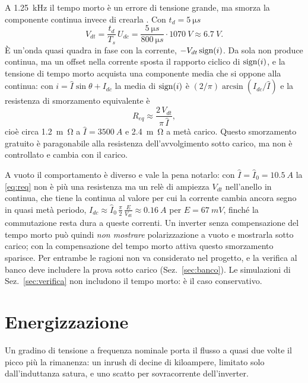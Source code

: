 \documentclass[10pt,a4paper]{scrartcl}
\newcommand{\Ts}{T_s}
\newcommand{\Idc}{I_{dc}}
\newcommand{\Izeropk}{\hat I_0}
\newcommand{\Udc}{U_{dc}}
\begin{document}
\begin{onehalfspace}
A \SI{1.25}{kHz} il tempo morto è un errore di tensione grande, ma smorza la componente continua invece di crearla \cite{jeong1991, holmes2003, pwrdeadtime}. Con $t_d = \SI{5}{\micro s}$
\begin{equation}
V_{dt} = \frac{t_d}{\Ts}\,\Udc = \frac{\SI{5}{\micro s}}{\SI{800}{\micro s}}\cdot\SI{1070}{V} \approx \SI{6.7}{V}.
\label{eq:vdt}
\end{equation}
È un'onda quasi quadra in fase con la corrente, $-V_{dt}\,\text{sign}(i)$. Da sola non produce continua, ma un offset nella corrente sposta il rapporto ciclico di $\text{sign}(i)$, e la tensione di tempo morto acquista una componente media che si oppone alla continua: con $i = \hat I\sin\theta + \Idc$ la media di $\text{sign}(i)$ è $(2/\pi)\arcsin(\Idc/\hat I)$ e la resistenza di smorzamento equivalente è
\begin{equation}
R_{eq} \approx \frac{2\,V_{dt}}{\pi\,\hat I},
\label{eq:req}
\end{equation}
cioè circa \SI{1.2}{m\ohm} a $\hat I = \SI{3500}{A}$ e \SI{2.4}{m\ohm} a metà carico. Questo smorzamento gratuito è paragonabile alla resistenza dell'avvolgimento sotto carico, ma non è controllato e cambia con il carico.

A vuoto il comportamento è diverso e vale la pena notarlo: con $\hat I = \Izeropk = \SI{10.5}{A}$ la \eqref{eq:req} non è più una resistenza ma un relè di ampiezza $V_{dt}$ nell'anello in continua, che tiene la continua al valore per cui la corrente cambia ancora segno in quasi metà periodo, $\Idc \approx \Izeropk\,\frac{\pi}{2}\,\frac{E}{V_{dt}} \approx \SI{0.16}{A}$ per $E = \SI{67}{mV}$, finché la commutazione resta dura a queste correnti. Un inverter senza compensazione del tempo morto può quindi \emph{non mostrare} polarizzazione a vuoto e mostrarla sotto carico; con la compensazione del tempo morto attiva questo smorzamento sparisce. Per entrambe le ragioni non va considerato nel progetto, e la verifica al banco deve includere la prova sotto carico (Sez.~\ref{sec:banco}). Le simulazioni di Sez.~\ref{sec:verifica} non includono il tempo morto: è il caso conservativo.

\section{Energizzazione}
\label{sec:energizzazione}

Un gradino di tensione a frequenza nominale porta il flusso a quasi due volte il picco più la rimanenza: un inrush di decine di kiloampere, limitato solo dall'induttanza satura, e uno scatto per sovracorrente dell'inverter.


\end{onehalfspace}
\end{document}
